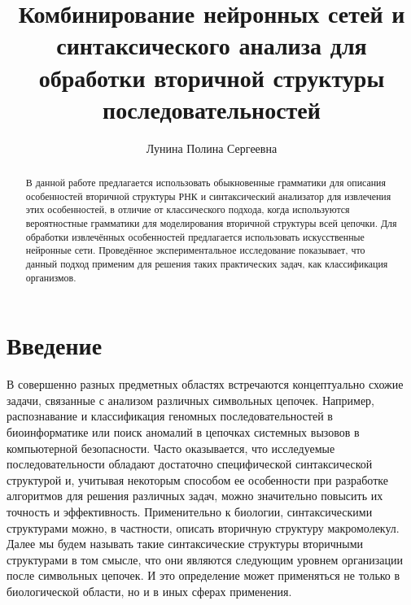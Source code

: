 \title{Комбинирование нейронных сетей и синтаксического анализа для обработки вторичной структуры последовательностей}


\author{Лунина Полина Сергеевна}



\maketitle

\begin{abstract}
В данной работе предлагается использовать обыкновенные грамматики для описания особенностей вторичной структуры РНК и синтаксический анализатор для извлечения этих особенностей, в отличие от классического подхода, когда используются вероятностные грамматики для моделирования вторичной структуры всей цепочки. Для обработки извлечённых особенностей предлагается использовать искусственные нейронные сети. Проведённое экспериментальное исследование показывает, что данный подход применим для решения таких практических задач, как классификация организмов.
\end{abstract}

\section*{Введение}
В совершенно разных предметных областях встречаются концептуально схожие задачи, связанные с анализом различных символьных цепочек. Например, распознавание и классификация геномных последовательностей в биоинформатике или поиск аномалий в цепочках системных вызовов в компьютерной безопасности. Часто оказывается, что исследуемые последовательности обладают достаточно специфической синтаксической структурой и, учитывая некоторым способом ее особенности при разработке алгоритмов для решения различных задач, можно значительно повысить их точность и эффективность. Применительно к биологии, синтаксическими структурами можно, в частности, описать вторичную структуру макромолекул. Далее мы будем называть такие синтаксические структуры вторичными структурами в том смысле, что они являются следующим уровнем организации после символьных цепочек. И это определение может применяться не только в биологической области, но и в иных сферах применения.

